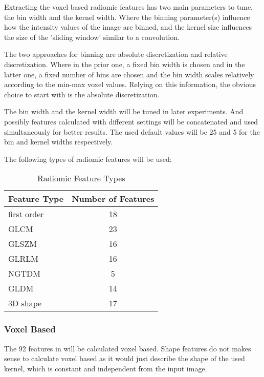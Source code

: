 Extracting the voxel based radiomic features has two main parameters to tune, the bin width and the kernel width. Where the binning parameter(s) influence how the intensity values of the image are binned, and the kernel size influences the size of the 'sliding window' similar to a convolution.\par

The two approaches for binning are absolute discretization and relative discretization. Where in the prior one, a fixed bin width is chosen and in the latter one, a fixed number of bins are chosen and the bin width scales relatively according to the min-max voxel values.  Relying on this information, the obvious choice to start with is the absolute discretization.\par
The bin width and the kernel width will be tuned in later experiments. And possibly features calculated with different settings will be concatenated and used simultaneously for better results. The used default values will be 25 and 5 for the bin and kernel widths respectively.\par
The following types of radiomic features will be used:
\begin{table}[H]
\centering
\begin{tabular}{|l|c|}
\hline
\textbf{Feature Type} & \textbf{Number of Features} \\ \hline
first order & 18 \\ \hline
\ac{GLCM} & 23 \\ \hline
\ac{GLSZM} & 16 \\ \hline
\ac{GLRLM} & 16 \\ \hline
\ac{NGTDM} & 5 \\ \hline
\ac{GLDM} & 14 \\ \hline
3D shape & 17 \\ \hline
\end{tabular}
\caption{Radiomic Feature Types}
\label{tab:radf0}
\end{table}

\subsubsection{Voxel Based}
The 92 features in  will be calculated voxel based. Shape features do not makes sense to calculate voxel based as it would just describe the shape of the used kernel, which is constant and independent from the input image.

